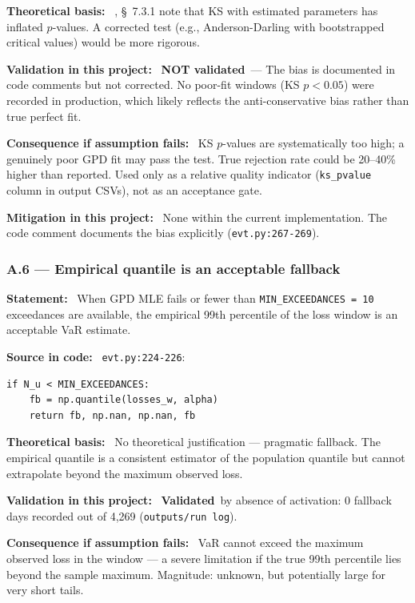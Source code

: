 \documentclass[11pt,a4paper]{article}
\newcommand{\asmfield}[1]{\medskip\noindent\textbf{#1:}\ }
\newcommand{\code}[1]{\texttt{#1}}
\newcommand{\validated}{\textbf{Validated}}
\newcommand{\notvalidated}{\textbf{NOT validated}}
\begin{document}
\asmfield{Theoretical basis}
\cite{McNeilFreyEmbrechts2005}, \S~7.3.1 note that KS with estimated
parameters has inflated $p$-values. A corrected test (e.g., Anderson-Darling
with bootstrapped critical values) would be more rigorous.

\asmfield{Validation in this project}
\notvalidated\ --- The bias is documented in code comments but not corrected.
No poor-fit windows (KS $p < 0.05$) were recorded in production, which
likely reflects the anti-conservative bias rather than true perfect fit.

\asmfield{Consequence if assumption fails}
KS $p$-values are systematically too high; a genuinely poor GPD fit may
pass the test. True rejection rate could be 20--40\% higher than reported.
Used only as a relative quality indicator (\code{ks\_pvalue} column in
output CSVs), not as an acceptance gate.

\asmfield{Mitigation in this project}
None within the current implementation. The code comment documents the
bias explicitly (\code{evt.py:267-269}).

\subsubsection{A.6 --- Empirical quantile is an acceptable fallback}\label{asm:A6}

\asmfield{Statement}
When GPD MLE fails or fewer than \code{MIN\_EXCEEDANCES = 10} exceedances
are available, the empirical 99th percentile of the loss window is an
acceptable VaR estimate.

\asmfield{Source in code}
\code{evt.py:224-226}:
\begin{lstlisting}
if N_u < MIN_EXCEEDANCES:
    fb = np.quantile(losses_w, alpha)
    return fb, np.nan, np.nan, fb
\end{lstlisting}

\asmfield{Theoretical basis}
No theoretical justification --- pragmatic fallback. The empirical quantile
is a consistent estimator of the population quantile but cannot extrapolate
beyond the maximum observed loss.

\asmfield{Validation in this project}
\validated\ by absence of activation: 0 fallback days recorded out of 4{,}269
(\code{outputs/run log}).

\asmfield{Consequence if assumption fails}
VaR cannot exceed the maximum observed loss in the window --- a severe
limitation if the true 99th percentile lies beyond the sample maximum.
Magnitude: unknown, but potentially large for very short tails.
\end{document}
